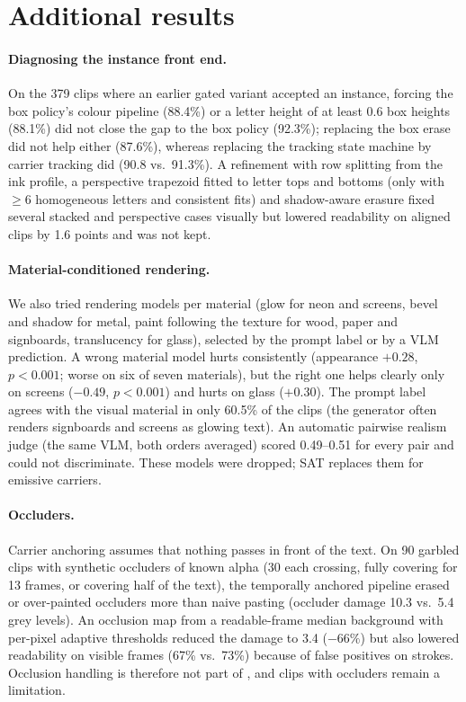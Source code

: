 \section{Additional results}
\label{sec:supp_results}

\paragraph{Diagnosing the instance front end.} On the 379 clips where an earlier gated variant accepted an instance, forcing the box policy's colour pipeline (88.4\%) or a letter height of at least 0.6 box heights (88.1\%) did not close the gap to the box policy (92.3\%); replacing the box erase did not help either (87.6\%), whereas replacing the tracking state machine by carrier tracking did (90.8 vs.\ 91.3\%). A refinement with row splitting from the ink profile, a perspective trapezoid fitted to letter tops and bottoms (only with $\geq$6 homogeneous letters and consistent fits) and shadow-aware erasure fixed several stacked and perspective cases visually but lowered readability on aligned clips by 1.6 points and was not kept.

\paragraph{Material-conditioned rendering.} We also tried rendering models per material (glow for neon and screens, bevel and shadow for metal, paint following the texture for wood, paper and signboards, translucency for glass), selected by the prompt label or by a VLM prediction. A wrong material model hurts consistently (appearance $+0.28$, $p<0.001$; worse on six of seven materials), but the right one helps clearly only on screens ($-0.49$, $p<0.001$) and hurts on glass ($+0.30$). The prompt label agrees with the visual material in only 60.5\% of the clips (the generator often renders signboards and screens as glowing text). An automatic pairwise realism judge (the same VLM, both orders averaged) scored 0.49--0.51 for every pair and could not discriminate. These models were dropped; SAT replaces them for emissive carriers.

\paragraph{Occluders.} Carrier anchoring assumes that nothing passes in front of the text. On 90 garbled clips with synthetic occluders of known alpha (30 each crossing, fully covering for 13 frames, or covering half of the text), the temporally anchored pipeline erased or over-painted occluders more than naive pasting (occluder damage 10.3 vs.\ 5.4 grey levels). An occlusion map from a readable-frame median background with per-pixel adaptive thresholds reduced the damage to 3.4 ($-66\%$) but also lowered readability on visible frames (67\% vs.\ 73\%) because of false positives on strokes. Occlusion handling is therefore not part of \method, and clips with occluders remain a limitation.

